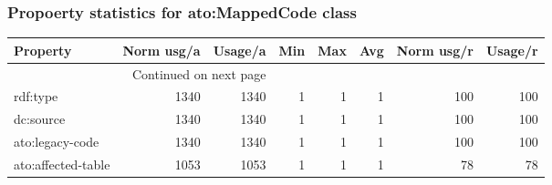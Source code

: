 \documentclass[10pt,a4paper,titlepage,final]{article}
\begin{document}
\subsubsection{Propoerty statistics for ato:MappedCode class}
\begin{longtable}{lrrrrrrr}
\toprule
           Property &  Norm usg/a &  Usage/a &  Min &  Max &  Avg &  Norm usg/r &  Usage/r \\
\midrule
\endhead
\midrule
\multicolumn{3}{r}{{Continued on next page}} \\
\midrule
\endfoot

\bottomrule
\endlastfoot
           rdf:type &        1340 &     1340 &    1 &    1 &    1 &         100 &      100 \\
          dc:source &        1340 &     1340 &    1 &    1 &    1 &         100 &      100 \\
    ato:legacy-code &        1340 &     1340 &    1 &    1 &    1 &         100 &      100 \\
 ato:affected-table &        1053 &     1053 &    1 &    1 &    1 &          78 &       78 \\
\end{longtable}
\end{document}
